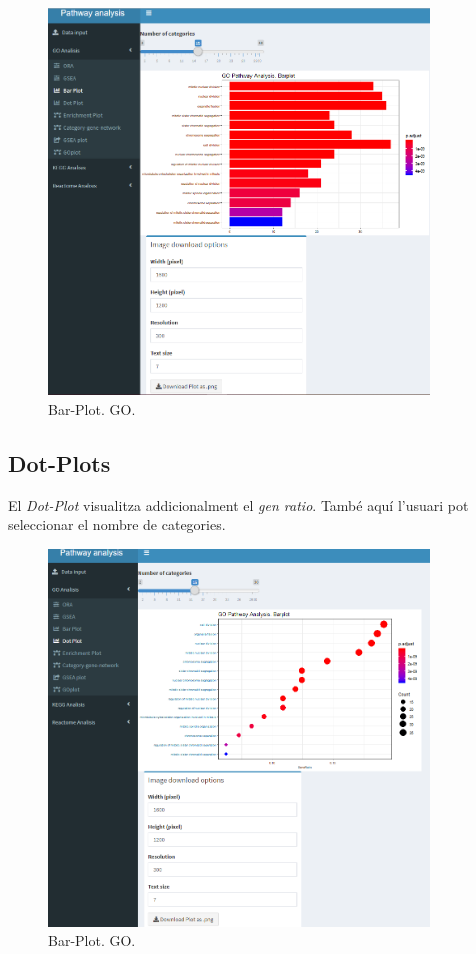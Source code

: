 \begin{figure}[H]
\centering
\includegraphics[width=0.9\textwidth]{figures/App_F14_Items_GO_BarPlot.png} 
\caption{\gls{Bar-Plot}. \gls{GO}.}
\end{figure}

\subsection{\gls{Dot-Plot}s}

El \textit{\gls{Dot-Plot}} visualitza addicionalment el \textit{gen ratio}. També aquí l'usuari pot seleccionar el nombre de categories.


\begin{figure}[H]
\centering
\includegraphics[width=0.9\textwidth]{figures/App_F15_Items_GO_DotPlot.png} 
\caption{\gls{Bar-Plot}. GO.}
\end{figure}

